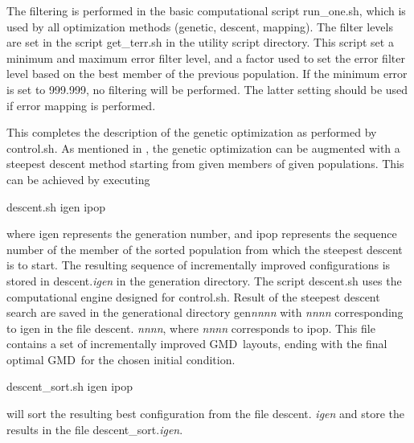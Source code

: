 \documentclass[12pt]{article}
\newcommand{\gmd}{GMD}
\newcommand{\file}{\sf}
\begin{document}
The filtering is performed in the basic computational script {\file
run\_one.sh}, which is used by all optimization methods (genetic, descent,
mapping).  The filter levels are set in the script {\file get\_terr.sh} in the
utility script directory. This script set a minimum and maximum error filter
level, and a factor used to set the error filter level based on the best
member of the previous population. If the minimum error is set to 999.999, no
filtering will be performed. The latter setting should be used if error
mapping is performed.


\vspace{\baselineskip}
\noindent 
This completes the description of the genetic optimization as performed by
{\file control.sh}. As mentioned in \cite{tol:MMAB10d}, the genetic
optimization can be augmented with a steepest descent method starting from
given members of given populations. This can be achieved by executing
\begin{center}
{\file descent.sh igen ipop}
\end{center}
\noindent
where {\file igen} represents the generation number, and {\file ipop}
represents the sequence number of the member of the sorted population from
which the steepest descent is to start. The resulting sequence of
incrementally improved configurations is stored in {\file descent.{\it igen}}
in the generation directory.  The script {\file descent.sh} uses the
computational engine designed for {\file control.sh}. Result of the steepest
descent search are saved in the generational directory {\file gen{\it nnnn}}
with {\it nnnn} corresponding to {\file igen} in the file {\file descent.{\it
nnnn}}, where {\it nnnn} corresponds to {\file ipop}. This file contains a set
of incrementally improved \gmd\ layouts, ending with the final optimal \gmd\
for the chosen initial condition.
\begin{center}
{\file descent\_sort.sh igen ipop}
\end{center}
\noindent
will sort the resulting best configuration from the file {\file descent.{\it
igen}} and store the results in the file {\file descent\_sort.{\it igen}}.
\end{document}

